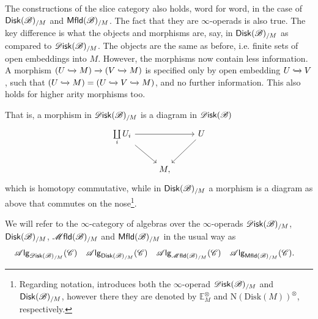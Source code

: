 \documentclass[../text]{subfiles}
\begin{document}
\begin{remark}
    The constructions of the slice category also holds, word for word, in the case of $\disk[r](\bstr)_{/M}$ and $\mfld[r](\bstr)_{/M}$. The fact that they are $\infty$-operads is also true. The key difference is what the objects and morphisms are, say, in $\disk[r](\bstr)_{/M}$ as compared to $\disk(\bstr)_{/M}$. The objects are the same as before, i.e. finite sets of open embeddings into $M$. However, the morphisms now contain less information. A morphism $(U \xhookrightarrow{} M) \xrightarrow{} (V \xhookrightarrow{} M)$ is specified only by open embedding $U \xhookrightarrow{} V$, such that $(U \xhookrightarrow{} M) = (U \xhookrightarrow{} V \xhookrightarrow{} M)$, and no further information. This also holds for higher arity morphisms too. 

    That is, a morphism in $\disk(\bstr)_{/M}$ is a diagram in $\disk (\bstr)$
    \begin{equation}
        \begin{tikzcd}
            \coprod\limits_{i} U_i \arrow[rr] \arrow[rd] & & U \arrow[ld] \\
            & M, &
        \end{tikzcd}
    \end{equation}
    which is homotopy commutative, while in $\disk[r](\bstr)_{/M}$ a morphism is a diagram as above that commutes on the nose\footnote{Regarding notation, \cite{lurie_ha} introduces both the $\infty$-operad $\disk(\bstr)_{/M}$ and $\disk[r](\bstr)_{/M}$, however there they are denoted by $\mathbb{E}_M^\otimes$ and $\mathrm{N}(\mathrm{Disk}(M))^\otimes$, respectively.}.
\end{remark}


\begin{definition}
    We will refer to the $\infty$-category of algebras over the $\infty$-operads $\disk(\bstr)_{/M}$, $\disk[r](\bstr)_{/M}$, $\mfld(\bstr)_{/M}$ and $\mfld[r](\bstr)_{/M}$ in the usual way as
    \begin{align}
        &\alg{\disk(\bstr)_{/M}} (\catC)& &\alg{\disk[r](\bstr)_{/M}} (\catC)& &\alg{\mfld(\bstr)_{/M}} (\catC)& &\alg{\mfld[r](\bstr)_{/M}} (\catC).&
    \end{align}
\end{definition}
\end{document}
